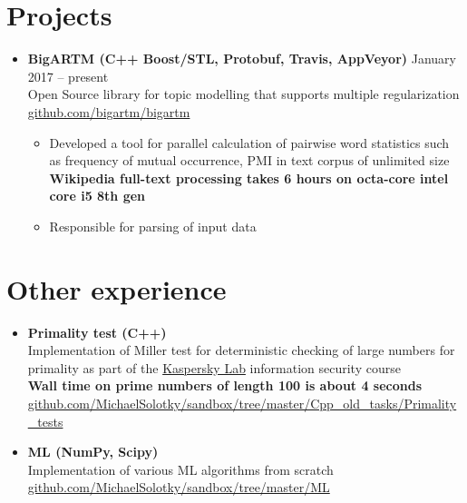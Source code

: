 \documentclass[letterpaper,11pt]{article}
\newcommand{\resumeSubHeadingListStart}{\begin{itemize}[leftmargin=*]}
\newcommand{\resumeSubHeadingListEnd}{\end{itemize}}
\begin{document}
\section{Projects}
\resumeSubHeadingListStart
    \item{
      \textbf{{BigARTM}{ (C++ Boost/STL, Protobuf, Travis, AppVeyor)}}
      \hfill
      January 2017 -- present
    } \\
    Open Source library for topic modelling that supports multiple regularization \\
    \faGithub \enspace \href{https://github.com/bigartm/bigartm}{\color{blue} github.com/bigartm/bigartm}
    \begin{itemize}
      \item Developed a tool for parallel calculation of pairwise word statistics such as frequency of mutual occurrence, PMI in text corpus of unlimited size \\
      \textbf{Wikipedia full-text processing takes 6 hours on octa-core intel core i5 8th gen}
      \item Responsible for parsing of input data
    \end{itemize}

  \resumeSubHeadingListEnd

\section{Other experience}
  \resumeSubHeadingListStart
      \item{
        \textbf{{Primality test}{ (C++) }} \\
        Implementation of Miller test for deterministic checking of large numbers for primality as part of the \href{https://www.kaspersky.com/}{\color{blue} Kaspersky Lab} information security course \\
        \textbf{Wall time on prime numbers of length 100 is about 4 seconds} \\
        \faGithub \enspace \href{https://github.com/MichaelSolotky/sandbox/tree/master/Cpp_old_tasks/Primality_tests}{\color{blue} github.com/MichaelSolotky/sandbox/tree/master/Cpp\_old\_tasks/Primality\_tests}
      }

      \item{
        \textbf{ML (NumPy, Scipy)} \\
        Implementation of various ML algorithms from scratch \\
        \faGithub \enspace \href{https://github.com/MichaelSolotky/sandbox/tree/master/ML}{\color{blue} github.com/MichaelSolotky/sandbox/tree/master/ML}
      }
      \resumeSubHeadingListEnd
\end{document}
